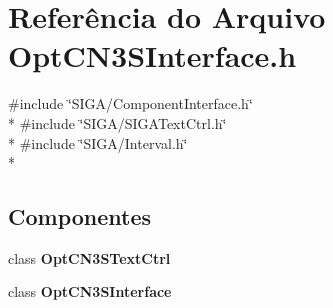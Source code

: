 \section{Referência do Arquivo Opt\+C\+N3\+S\+Interface.\+h}
\label{_opt_c_n3_s_interface_8h}
{\ttfamily \#include \char`\"{}S\+I\+G\+A/\+Component\+Interface.\+h\char`\"{}}\\*
{\ttfamily \#include \char`\"{}S\+I\+G\+A/\+S\+I\+G\+A\+Text\+Ctrl.\+h\char`\"{}}\\*
{\ttfamily \#include \char`\"{}S\+I\+G\+A/\+Interval.\+h\char`\"{}}\\*
\subsection*{Componentes}
\begin{DoxyCompactItemize}
\item 
class {\bf Opt\+C\+N3\+S\+Text\+Ctrl}
\item 
class {\bf Opt\+C\+N3\+S\+Interface}
\end{DoxyCompactItemize}
